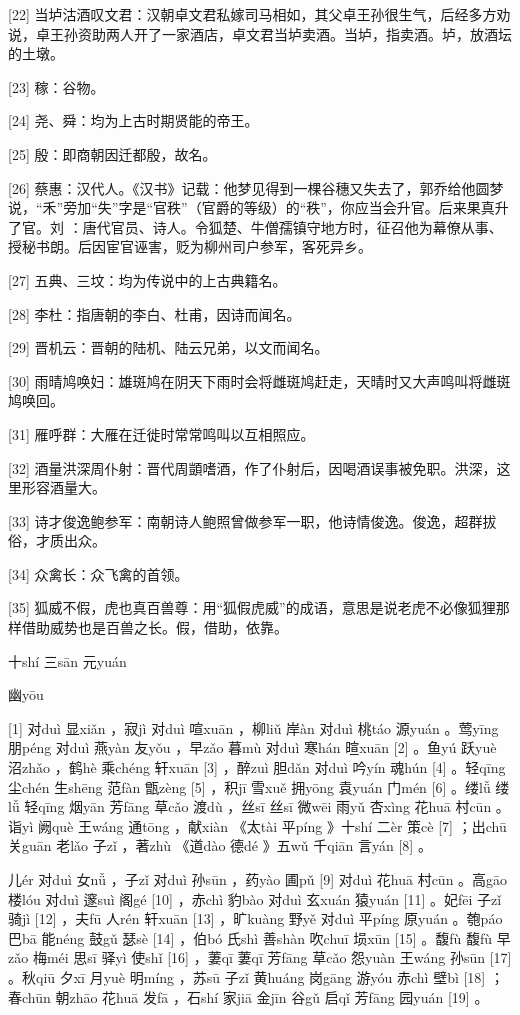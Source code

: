 \documentclass[12pt,UTF8]{ctexbook}
\begin{document}
[22] 当垆沽酒叹文君：汉朝卓文君私嫁司马相如，其父卓王孙很生气，后经多方劝说，卓王孙资助两人开了一家酒店，卓文君当垆卖酒。当垆，指卖酒。垆，放酒坛的土墩。

[23] 稼：谷物。

[24] 尧、舜：均为上古时期贤能的帝王。

[25] 殷：即商朝因迁都殷，故名。

[26] 蔡惠：汉代人。《汉书》记载：他梦见得到一棵谷穗又失去了，郭乔给他圆梦说，“禾”旁加“失”字是“官秩”（官爵的等级）的“秩”，你应当会升官。后来果真升了官。刘 ：唐代官员、诗人。令狐楚、牛僧孺镇守地方时，征召他为幕僚从事、授秘书朗。后因宦官诬害，贬为柳州司户参军，客死异乡。

[27] 五典、三坟：均为传说中的上古典籍名。

[28] 李杜：指唐朝的李白、杜甫，因诗而闻名。

[29] 晋机云：晋朝的陆机、陆云兄弟，以文而闻名。

[30] 雨晴鸠唤妇：雄斑鸠在阴天下雨时会将雌斑鸠赶走，天晴时又大声鸣叫将雌斑鸠唤回。

[31] 雁呼群：大雁在迁徙时常常鸣叫以互相照应。

[32] 酒量洪深周仆射：晋代周顗嗜酒，作了仆射后，因喝酒误事被免职。洪深，这里形容酒量大。

[33] 诗才俊逸鲍参军：南朝诗人鲍照曾做参军一职，他诗情俊逸。俊逸，超群拔俗，才质出众。

[34] 众禽长：众飞禽的首领。

[35] 狐威不假，虎也真百兽尊：用“狐假虎威”的成语，意思是说老虎不必像狐狸那样借助威势也是百兽之长。假，借助，依靠。





十shí 三sān 元yuán


幽yōu





[1] 对duì 显xiǎn ，寂jì 对duì 喧xuān ，柳liǔ 岸àn 对duì 桃táo 源yuán 。莺yīng 朋péng 对duì 燕yàn 友yǒu ，早zǎo 暮mù 对duì 寒hán 暄xuān [2] 。鱼yú 跃yuè 沼zhǎo ，鹤hè 乘chéng 轩xuān [3] ，醉zuì 胆dǎn 对duì 吟yín 魂hún [4] 。轻qīng 尘chén 生shēng 范fàn 甑zèng [5] ，积jī 雪xuě 拥yōng 袁yuán 门mén [6] 。缕lǚ 缕lǚ 轻qīng 烟yān 芳fāng 草cǎo 渡dù ，丝sī 丝sī 微wēi 雨yǔ 杏xìng 花huā 村cūn 。诣yì 阙què 王wáng 通tōng ，献xiàn 《太tài 平píng 》十shí 二èr 策cè [7] ；出chū 关guān 老lǎo 子zǐ ，著zhù 《道dào 德dé 》五wǔ 千qiān 言yán [8] 。

儿ér 对duì 女nǚ ，子zǐ 对duì 孙sūn ，药yào 圃pǔ [9] 对duì 花huā 村cūn 。高gāo 楼lóu 对duì 邃suì 阁gé [10] ，赤chì 豹bào 对duì 玄xuán 猿yuán [11] 。妃fēi 子zǐ 骑jì [12] ，夫fū 人rén 轩xuān [13] ，旷kuàng 野yě 对duì 平píng 原yuán 。匏páo 巴bā 能néng 鼓gǔ 瑟sè [14] ，伯bó 氏shì 善shàn 吹chuī 埙xūn [15] 。馥fù 馥fù 早zǎo 梅méi 思sī 驿yì 使shǐ [16] ，萋qī 萋qī 芳fāng 草cǎo 怨yuàn 王wáng 孙sūn [17] 。秋qiū 夕xī 月yuè 明míng ，苏sū 子zǐ 黄huáng 岗gāng 游yóu 赤chì 壁bì [18] ；春chūn 朝zhāo 花huā 发fā ，石shí 家jiā 金jīn 谷gǔ 启qǐ 芳fāng 园yuán [19] 。
\end{document}
